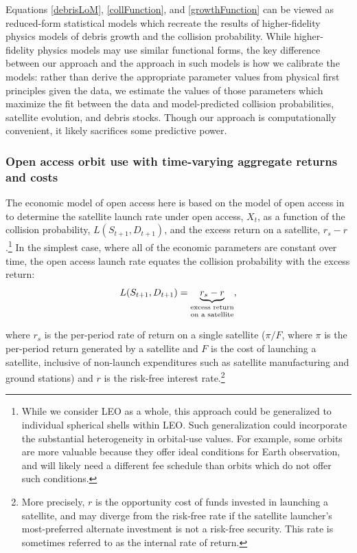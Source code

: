 \documentclass[9pt,twoside,lineno]{pnas-new}
\begin{document}
Equations \ref{debrisLoM}, \ref{collFunction}, and \ref{growthFunction} can be viewed as reduced-form statistical models which recreate the results of higher-fidelity physics models of debris growth and the collision probability. While higher-fidelity physics models may use similar functional forms, the key difference between our approach and the approach in such models is how we calibrate the models: rather than derive the appropriate parameter values from physical first principles given the data, we estimate the values of those parameters which maximize the fit between the data and model-predicted collision probabilities, satellite evolution, and debris stocks. Though our approach is computationally convenient, it likely sacrifices some predictive power.

\subsubsection{Open access orbit use with time-varying aggregate returns and costs}

The economic model of open access here is based on the model of open access in \cite{rao2019diss} to determine the satellite launch rate under open access, $X_t$, as a function of the collision probability, $L(S_{t+1},D_{t+1})$, and the excess return on a satellite, $r_{s} - r$.\footnote{While we consider LEO as a whole, this approach could be generalized to individual spherical shells within LEO. Such generalization could incorporate the substantial heterogeneity in orbital-use values. For example, some orbits are more valuable because they offer ideal conditions for Earth observation, and will likely need a different fee schedule than orbits which do not offer such conditions.} In the simplest case, where all of the economic parameters are constant over time, the open access launch rate equates the collision probability with the excess return:
\begin{equation}
\label{OAeqm_ch3}
L(S_{t+1},D_{t+1}) = \underbrace{r_s - r}_{\text{\shortstack{excess return\\on a satellite}}},
\end{equation}

where $r_s$ is the per-period rate of return on a single satellite ($\pi/F$, where $\pi$ is the per-period return generated by a satellite and $F$ is the cost of launching a satellite, inclusive of non-launch expenditures such as satellite manufacturing and ground stations) and $r$ is the risk-free interest rate.\footnote{More precisely, $r$ is the opportunity cost of funds invested in launching a satellite, and may diverge from the risk-free rate if the satellite launcher's most-preferred alternate investment is not a risk-free security. This rate is sometimes referred to as the internal rate of return.} \\
\end{document}
